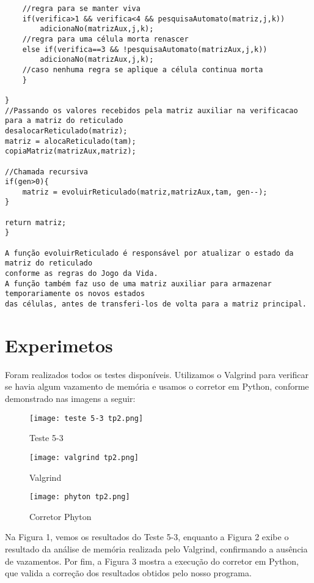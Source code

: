 \documentclass{article}
\begin{document}
\begin{verbatim}
    //regra para se manter viva
    if(verifica>1 && verifica<4 && pesquisaAutomato(matriz,j,k))
        adicionaNo(matrizAux,j,k);
    //regra para uma célula morta renascer
    else if(verifica==3 && !pesquisaAutomato(matrizAux,j,k))
        adicionaNo(matrizAux,j,k);
    //caso nenhuma regra se aplique a célula continua morta
    }
    
}
//Passando os valores recebidos pela matriz auxiliar na verificacao para a matriz do reticulado
desalocarReticulado(matriz);
matriz = alocaReticulado(tam);
copiaMatriz(matrizAux,matriz);

//Chamada recursiva
if(gen>0){
    matriz = evoluirReticulado(matriz,matrizAux,tam, gen--);
}

return matriz;
}

A função evoluirReticulado é responsável por atualizar o estado da matriz do reticulado 
conforme as regras do Jogo da Vida.
A função também faz uso de uma matriz auxiliar para armazenar temporariamente os novos estados
das células, antes de transferi-los de volta para a matriz principal.
\end{verbatim}

\clearpage
\section{Experimetos}
  Foram realizados todos os testes disponíveis. Utilizamos o Valgrind para verificar se havia algum vazamento de memória e usamos o corretor em Python, conforme demonstrado nas imagens a seguir:

\begin{figure}[!htb]
    \centering
    \texttt{[image: teste 5-3 tp2.png]}
    \caption{Teste 5-3}
    \label{fig:enter-labe}
\end{figure}

\begin{figure}[!htb]
    \centering
    \texttt{[image: valgrind tp2.png]}
    \caption{Valgrind}
    \label{fig:enter-label}
\end{figure}

\begin{figure}[!htb]
    \centering
    \texttt{[image: phyton tp2.png]}
    \caption{Corretor Phyton}
    \label{fig:enter-label}
\end{figure}

Na Figura 1, vemos os resultados do Teste 5-3, enquanto a Figura 2 exibe o resultado da análise de memória realizada pelo Valgrind, confirmando a ausência de vazamentos. Por fim, a Figura 3 mostra a execução do corretor em Python, que valida a correção dos resultados obtidos pelo nosso programa.
\end{document}
